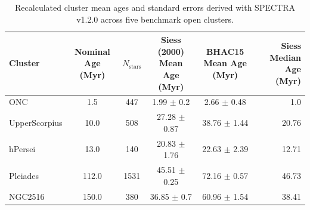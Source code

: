 \begin{table}
\centering
\caption{Recalculated cluster mean ages and standard errors derived with \textsc{SPECTRA} v1.2.0 across five benchmark open clusters.}
\label{tab:recalculated_cluster_ages}
\begin{tabular}{lccccr}
\hline
Cluster & Nominal Age (Myr) & $N_{\text{stars}}$ & Siess (2000) Mean Age (Myr) & BHAC15 Mean Age (Myr) & Siess Median Age (Myr) \\
\hline
ONC & 1.5 & 447 & 1.99 $\pm$ 0.2 & 2.66 $\pm$ 0.48 & 1.0 \\
UpperScorpius & 10.0 & 508 & 27.28 $\pm$ 0.87 & 38.76 $\pm$ 1.44 & 20.76 \\
hPersei & 13.0 & 140 & 20.83 $\pm$ 1.76 & 22.63 $\pm$ 2.39 & 12.71 \\
Pleiades & 112.0 & 1531 & 45.51 $\pm$ 0.25 & 72.16 $\pm$ 0.57 & 46.73 \\
NGC2516 & 150.0 & 380 & 36.85 $\pm$ 0.7 & 60.96 $\pm$ 1.54 & 38.41 \\
\hline
\end{tabular}
\end{table}